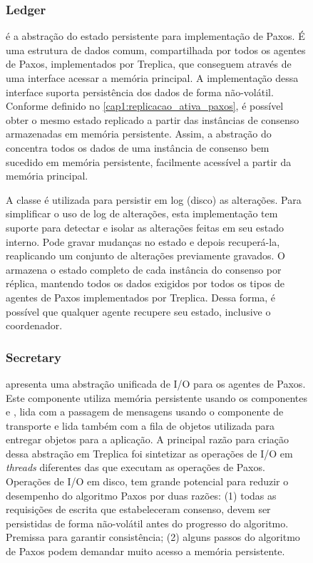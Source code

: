 \begin{figure}[ht]
\subsubsection{Ledger}

 é a abstração do estado persistente para implementação de Paxos. É uma
estrutura de dados comum, compartilhada por todos os agentes de Paxos, implementados por
Treplica, que conseguem através de uma interface acessar a memória principal. A
implementação dessa interface suporta persistência dos dados de forma não-volátil.
Conforme definido no \autoref{cap1:replicacao_ativa_paxos}, é possível obter o mesmo
estado replicado a partir das instâncias de consenso armazenadas em memória persistente.
Assim, a abstração do  concentra todos os dados de uma instância de
consenso bem sucedido em memória persistente, facilmente acessível a partir da memória
principal. 

A classe  é utilizada para persistir em log (disco) as
alterações. Para simplificar o uso de log de alterações, esta implementação tem suporte
para detectar e isolar as alterações feitas em seu estado interno. Pode gravar mudanças no
estado e depois recuperá-la, reaplicando um conjunto de alterações previamente gravados. O
 armazena o estado completo de cada instância do consenso por réplica,
mantendo todos os dados exigidos por todos os tipos de agentes de Paxos implementados por
Treplica. Dessa forma, é possível que qualquer agente recupere seu estado, inclusive o
coordenador.

\subsubsection{Secretary}

 apresenta uma abstração unificada de I/O para os agentes de Paxos.
Este componente utiliza memória persistente usando os componentes  e
, lida com a passagem de mensagens usando o componente de transporte e
lida também com a fila de objetos utilizada para entregar objetos para a aplicação. A
principal razão para criação dessa abstração em Treplica foi sintetizar as operações de
I/O em \emph{threads} diferentes das que executam as operações de Paxos. Operações de I/O
em disco, tem grande potencial para reduzir o desempenho do algoritmo Paxos por duas
razões: (1) todas as requisições de escrita que estabeleceram consenso, devem ser
persistidas de forma não-volátil antes do progresso do algoritmo. Premissa para garantir
consistência; (2) alguns passos do algoritmo de Paxos podem demandar muito acesso a
memória persistente. 


\end{figure}
